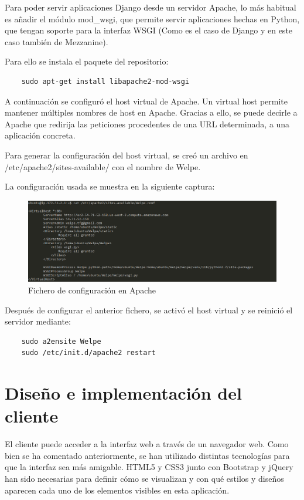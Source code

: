 Para poder servir aplicaciones Django desde un servidor Apache, lo más habitual es añadir el módulo mod\_wsgi, que permite servir aplicaciones hechas en Python, que tengan soporte para la interfaz WSGI (Como es el caso de Django y en este caso también de Mezzanine).


Para ello se instala el paquete del repositorio:
\begin{verbatim}
	sudo apt-get install libapache2-mod-wsgi
\end{verbatim}

A continuación se configuró el host virtual de Apache. Un virtual host permite mantener múltiples nombres de host en Apache. Gracias a ello, se puede decirle a Apache que redirija las peticiones procedentes de una URL determinada, a una aplicación concreta.

Para generar la configuración del host virtual, se creó un archivo en /etc/apache2/sites-available/ con el nombre de Welpe.

La configuración usada se muestra en la siguiente captura:

\begin{figure}[H]
   \centering
   \includegraphics[width=12cm]{img/welpe_conf}
   \caption{Fichero de configuración en Apache}
   \label{figura:welpe_conf}
\end{figure}

Después de configurar el anterior fichero, se activó el host virtual y se reinició el servidor mediante:
\begin{verbatim}
	sudo a2ensite Welpe
	sudo /etc/init.d/apache2 restart
\end{verbatim}


\section{Diseño e implementación del cliente} 
\label{sec:cliente}


El cliente puede acceder a la interfaz web a través de un navegador web. Como bien se ha comentado anteriormente, se han utilizado distintas tecnologías para que la interfaz sea más amigable. HTML5 y CSS3 junto con Bootstrap y jQuery han sido necesarias para definir cómo se visualizan y con qué estilos y diseños aparecen cada uno de los elementos visibles en esta aplicación. 

